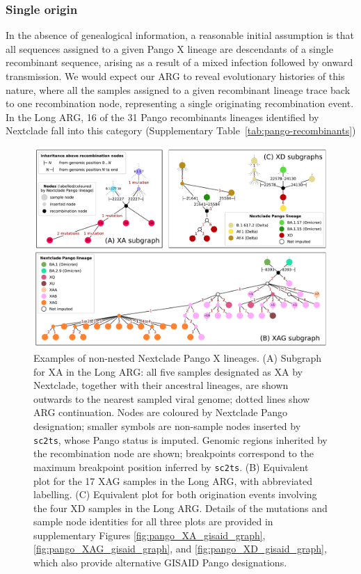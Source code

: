 \documentclass{article}
\begin{document}
\subsubsection{Single origin}
In the absence of genealogical information, a reasonable initial assumption is
that all sequences
assigned to a given Pango X lineage are descendants of a single recombinant
sequence, arising as a result of a mixed infection followed by onward
transmission. We would expect our ARG to reveal evolutionary histories of this
nature, where all the samples assigned to a given recombinant lineage
trace back to one recombination node, representing a single originating
recombination event. In the Long ARG, 16 of the 31 Pango recombinants lineages identified by Nextclade
fall into this category (Supplementary Table~\ref{tab:pango-recombinants})

\begin{figure}
\centering
\includegraphics[width=\textwidth]{figures/Pango_XA_XAG_XD_nxcld_tight_graph.pdf}

\caption{\label{fig:pango-simple-origin-graph} Examples of non-nested
Nextclade Pango X lineages. (A) Subgraph for XA in the Long ARG: all five samples designated
as XA by Nextclade, together with their ancestral lineages, are shown outwards to the nearest
sampled viral genome; dotted lines show ARG continuation. Nodes are coloured by Nextclade
Pango designation; smaller symbols are non-sample nodes inserted by
\texttt{sc2ts}, whose Pango status is imputed. Genomic regions inherited by the recombination node are shown;
breakpoints correspond to the maximum breakpoint position inferred by \texttt{sc2ts}.
(B) Equivalent plot for the 17 XAG samples in the Long ARG, with abbreviated labelling.
(C) Equivalent plot for both origination events involving the four XD samples in the Long ARG.
Details of the mutations and sample node identities for all three plots are provided in
supplementary Figures \ref{fig:pango_XA_gisaid_graph}, \ref{fig:pango_XAG_gisaid_graph}, and \ref{fig:pango_XD_gisaid_graph}, which also provide alternative GISAID Pango designations.
} \end{figure}
\end{document}

